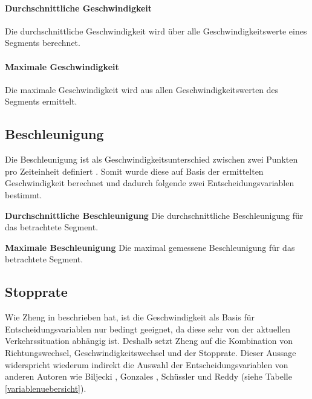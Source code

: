 \paragraph{Durchschnittliche Geschwindigkeit} Die durchschnittliche Geschwindigkeit wird über alle Geschwindigkeitswerte eines Segments berechnet.

\paragraph{Maximale Geschwindigkeit} Die maximale Geschwindigkeit wird aus allen Geschwindigkeitswerten des Segments ermittelt.

\subsection{Beschleunigung}
Die Beschleunigung ist als Geschwindigkeitsunterschied zwischen zwei Punkten pro Zeiteinheit definiert \cite[S.~51]{douglas_giancoli_physik_2010}. Somit wurde diese auf Basis der ermittelten Geschwindigkeit berechnet und dadurch folgende zwei Entscheidungsvariablen bestimmt.

\begin{pitemize}
\item \textbf{Durchschnittliche Beschleunigung} Die durchschnittliche Beschleunigung für das betrachtete Segment. 
\item \textbf{Maximale Beschleunigung} Die maximal gemessene Beschleunigung für das betrachtete Segment.
\end{pitemize}

\subsection{Stopprate}
\label{stopprate}
Wie Zheng in \cite{zheng_understanding_2010} beschrieben hat, ist die Geschwindigkeit als Basis für Entscheidungsvariablen nur bedingt geeignet, da diese sehr von der aktuellen Verkehrssituation abhängig ist. Deshalb setzt Zheng auf die Kombination von Richtungswechsel, Geschwindigkeitswechsel und der Stopprate. Dieser Aussage widerspricht wiederum indirekt die Auswahl der Entscheidungsvariablen von anderen Autoren wie Biljecki  \cite{biljecki_transportation_2013}, Gonzales \cite{gonzalez_automating_2010}, Schüssler \cite{nadine_schussler_improving_2011} und Reddy \cite{reddy_using_2010} (siehe Tabelle \ref{variablenuebersicht}). 

